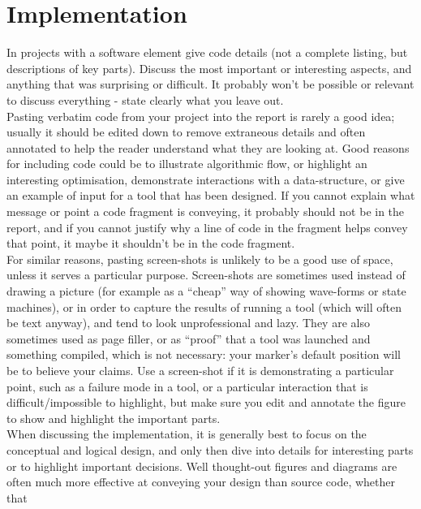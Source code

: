 \section{Implementation}
In projects with a software element give code details
(not a complete listing, but descriptions of key parts).
Discuss the most important or interesting aspects, and
anything that was surprising or difficult. It probably
won't be possible or relevant to discuss everything -
state clearly what you leave out.\\ \newline \noindent Pasting verbatim code from your project into the
report is rarely a good idea; usually it should be edited
down to remove extraneous details and often
annotated to help the reader understand what they
are looking at. Good reasons for including code could
be to illustrate algorithmic flow, or highlight an
interesting optimisation, demonstrate interactions
with a data-structure, or give an example of input for
a tool that has been designed. If you cannot explain
what message or point a code fragment is conveying, it probably should not be in the report, and if you
cannot justify why a line of code in the fragment helps
convey that point, it maybe it shouldn't be in the code
fragment.\\ \newline \noindent For similar reasons, pasting screen-shots is unlikely to
be a good use of space, unless it serves a particular
purpose. Screen-shots are sometimes used instead of
drawing a picture (for example as a “cheap” way of
showing wave-forms or state machines), or in order to
capture the results of running a tool (which will often
be text anyway), and tend to look unprofessional and
lazy. They are also sometimes used as page filler, or as
“proof” that a tool was launched and something
compiled, which is not necessary: your marker's
default position will be to believe your claims. Use a
screen-shot if it is demonstrating a particular point,
such as a failure mode in a tool, or a particular
interaction that is difficult/impossible to highlight, but
make sure you edit and annotate the figure to show
and highlight the important parts. \\ \newline \noindent When discussing the implementation, it is generally
best to focus on the conceptual and logical design,
and only then dive into details for interesting parts or
to highlight important decisions. Well thought-out
figures and diagrams are often much more effective at
conveying your design than source code, whether that
